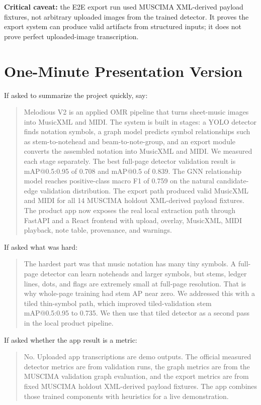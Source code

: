 \documentclass[11pt]{article}
\newcommand{\warn}[1]{\textcolor{melorange}{\textbf{#1}}}
\newcommand{\project}{Melodious V2}
\begin{document}
\warn{Critical caveat:} the E2E export run used MUSCIMA XML-derived payload fixtures, not arbitrary uploaded images from the trained detector. It proves the export system can produce valid artifacts from structured inputs; it does not prove perfect uploaded-image transcription.

\section{One-Minute Presentation Version}

If asked to summarize the project quickly, say:

\begin{quote}
\project{} is an applied OMR pipeline that turns sheet-music images into MusicXML and MIDI. The system is built in stages: a YOLO detector finds notation symbols, a graph model predicts symbol relationships such as stem-to-notehead and beam-to-note-group, and an export module converts the assembled notation into MusicXML and MIDI. We measured each stage separately. The best full-page detector validation result is mAP@0.5:0.95 of 0.708 and mAP@0.5 of 0.839. The GNN relationship model reaches positive-class macro F1 of 0.759 on the natural candidate-edge validation distribution. The export path produced valid MusicXML and MIDI for all 14 MUSCIMA holdout XML-derived payload fixtures. The product app now exposes the real local extraction path through FastAPI and a React frontend with upload, overlay, MusicXML, MIDI playback, note table, provenance, and warnings.
\end{quote}

If asked what was hard:

\begin{quote}
The hardest part was that music notation has many tiny symbols. A full-page detector can learn noteheads and larger symbols, but stems, ledger lines, dots, and flags are extremely small at full-page resolution. That is why whole-page training had stem AP near zero. We addressed this with a tiled thin-symbol path, which improved tiled-validation stem mAP@0.5:0.95 to 0.735. We then use that tiled detector as a second pass in the local product pipeline.
\end{quote}

If asked whether the app result is a metric:

\begin{quote}
No. Uploaded app transcriptions are demo outputs. The official measured detector metrics are from validation runs, the graph metrics are from the MUSCIMA validation graph evaluation, and the export metrics are from fixed MUSCIMA holdout XML-derived payload fixtures. The app combines those trained components with heuristics for a live demonstration.
\end{quote}
\end{document}
